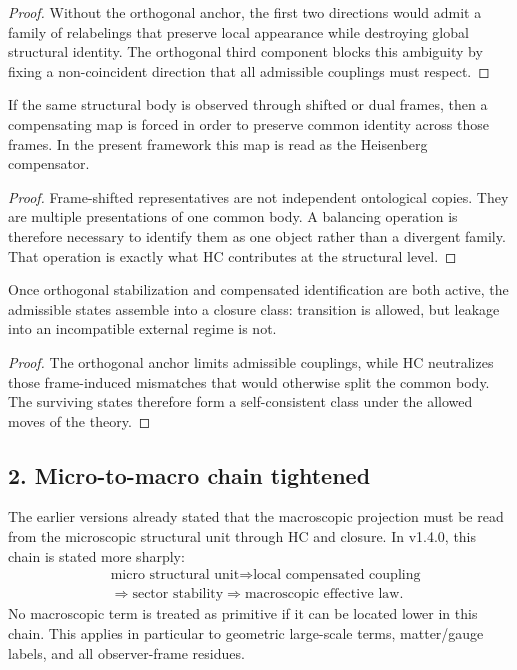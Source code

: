 \begin{proof}
Without the orthogonal anchor, the first two directions would admit a family of
relabelings that preserve local appearance while destroying global structural
identity. The orthogonal third component blocks this ambiguity by fixing a
non-coincident direction that all admissible couplings must respect.
\end{proof}

\begin{lemma}
\label{lem:compensated-identification-lemma}
If the same structural body is observed through shifted or dual frames, then a
compensating map is forced in order to preserve common identity across those
frames. In the present framework this map is read as the Heisenberg
compensator.
\end{lemma}

\begin{proof}
Frame-shifted representatives are not independent ontological copies. They are
multiple presentations of one common body. A balancing operation is therefore
necessary to identify them as one object rather than a divergent family. That
operation is exactly what HC contributes at the structural level.
\end{proof}

\begin{lemma}
\label{lem:closure-class-lemma}
Once orthogonal stabilization and compensated identification are both active,
the admissible states assemble into a closure class: transition is allowed,
but leakage into an incompatible external regime is not.
\end{lemma}

\begin{proof}
The orthogonal anchor limits admissible couplings, while HC neutralizes those
frame-induced mismatches that would otherwise split the common body. The
surviving states therefore form a self-consistent class under the allowed
moves of the theory.
\end{proof}

\subsection*{2. Micro-to-macro chain tightened}
The earlier versions already stated that the macroscopic projection must be read
from the microscopic structural unit through HC and closure. In v1.4.0,
this chain is stated more sharply:
\[
\begin{aligned}
&\text{micro structural unit} \Longrightarrow \text{local compensated coupling}\\
&\Longrightarrow \text{sector stability} \Longrightarrow \text{macroscopic effective law}.
\end{aligned}
\]
No macroscopic term is treated as primitive if it can be located lower in this
chain. This applies in particular to geometric large-scale terms, matter/gauge
labels, and all observer-frame residues.

